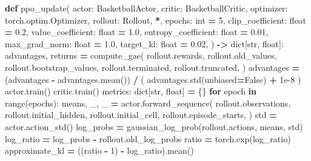 \documentclass[
  american,
  11pt,
  letterpaper,
]{article}
\newenvironment{Shaded}{\begin{snugshade}}{\end{snugshade}}
\newcommand{\BuiltInTok}[1]{#1}
\newcommand{\ControlFlowTok}[1]{\textcolor[rgb]{0.13,0.29,0.53}{\textbf{#1}}}
\newcommand{\DecValTok}[1]{\textcolor[rgb]{0.00,0.00,0.81}{#1}}
\newcommand{\FloatTok}[1]{\textcolor[rgb]{0.00,0.00,0.81}{#1}}
\newcommand{\KeywordTok}[1]{\textcolor[rgb]{0.13,0.29,0.53}{\textbf{#1}}}
\newcommand{\NormalTok}[1]{#1}
\newcommand{\OperatorTok}[1]{\textcolor[rgb]{0.81,0.36,0.00}{\textbf{#1}}}
\newcommand{\VariableTok}[1]{\textcolor[rgb]{0.00,0.00,0.00}{#1}}
\renewenvironment{Shaded}{\par\smallskip}{\par\smallskip}
\begin{document}
\begin{Shaded}
\begin{Highlighting}[]
\KeywordTok{def}\NormalTok{ ppo\_update(}
\NormalTok{    actor: BasketballActor,}
\NormalTok{    critic: BasketballCritic,}
\NormalTok{    optimizer: torch.optim.Optimizer,}
\NormalTok{    rollout: Rollout,}
    \OperatorTok{*}\NormalTok{,}
\NormalTok{    epochs: }\BuiltInTok{int} \OperatorTok{=} \DecValTok{5}\NormalTok{,}
\NormalTok{    clip\_coefficient: }\BuiltInTok{float} \OperatorTok{=} \FloatTok{0.2}\NormalTok{,}
\NormalTok{    value\_coefficient: }\BuiltInTok{float} \OperatorTok{=} \FloatTok{1.0}\NormalTok{,}
\NormalTok{    entropy\_coefficient: }\BuiltInTok{float} \OperatorTok{=} \FloatTok{0.01}\NormalTok{,}
\NormalTok{    max\_grad\_norm: }\BuiltInTok{float} \OperatorTok{=} \FloatTok{1.0}\NormalTok{,}
\NormalTok{    target\_kl: }\BuiltInTok{float} \OperatorTok{=} \FloatTok{0.02}\NormalTok{,}
\NormalTok{) }\OperatorTok{{-}\textgreater{}} \BuiltInTok{dict}\NormalTok{[}\BuiltInTok{str}\NormalTok{, }\BuiltInTok{float}\NormalTok{]:}
\NormalTok{    advantages, returns }\OperatorTok{=}\NormalTok{ compute\_gae(}
\NormalTok{        rollout.rewards,}
\NormalTok{        rollout.old\_values,}
\NormalTok{        rollout.bootstrap\_values,}
\NormalTok{        rollout.terminated,}
\NormalTok{        rollout.truncated,}
\NormalTok{    )}
\NormalTok{    advantages }\OperatorTok{=}\NormalTok{ (advantages }\OperatorTok{{-}}\NormalTok{ advantages.mean()) }\OperatorTok{/}\NormalTok{ (}
\NormalTok{        advantages.std(unbiased}\OperatorTok{=}\VariableTok{False}\NormalTok{) }\OperatorTok{+} \FloatTok{1e{-}8}
\NormalTok{    )}
\NormalTok{    actor.train()}
\NormalTok{    critic.train()}
\NormalTok{    metrics: }\BuiltInTok{dict}\NormalTok{[}\BuiltInTok{str}\NormalTok{, }\BuiltInTok{float}\NormalTok{] }\OperatorTok{=}\NormalTok{ \{\}}
    \ControlFlowTok{for}\NormalTok{ epoch }\KeywordTok{in} \BuiltInTok{range}\NormalTok{(epochs):}
\NormalTok{        means, \_, \_ }\OperatorTok{=}\NormalTok{ actor.forward\_sequence(}
\NormalTok{            rollout.observations,}
\NormalTok{            rollout.initial\_hidden,}
\NormalTok{            rollout.initial\_cell,}
\NormalTok{            rollout.episode\_starts,}
\NormalTok{        )}
\NormalTok{        std }\OperatorTok{=}\NormalTok{ actor.action\_std()}
\NormalTok{        log\_probs }\OperatorTok{=}\NormalTok{ gaussian\_log\_prob(rollout.actions, means, std)}
\NormalTok{        log\_ratio }\OperatorTok{=}\NormalTok{ log\_probs }\OperatorTok{{-}}\NormalTok{ rollout.old\_log\_probs}
\NormalTok{        ratio }\OperatorTok{=}\NormalTok{ torch.exp(log\_ratio)}
\NormalTok{        approximate\_kl }\OperatorTok{=}\NormalTok{ ((ratio }\OperatorTok{{-}} \DecValTok{1}\NormalTok{) }\OperatorTok{{-}}\NormalTok{ log\_ratio).mean()}

\end{Highlighting}
\end{Shaded}
\end{document}
